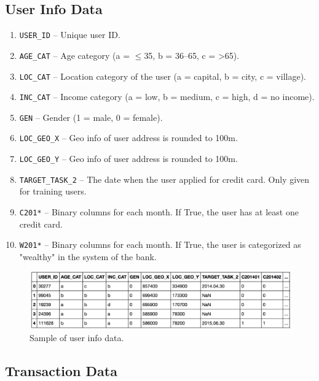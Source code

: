 \documentclass{llncs}
\begin{document}
	\subsection{User Info Data}
	
	\begin{enumerate}
		\item \verb|USER_ID| -- Unique user ID.
		\item \verb|AGE_CAT| -- Age category (a = $\le$35, b = 36--65, c = >65).
		\item \verb|LOC_CAT| -- Location category of the user (a = capital, b = city, c = village).
		\item \verb|INC_CAT| -- Income category (a = low, b = medium, c = high, d = no income).
		\item \verb|GEN| -- Gender (1 = male, 0 = female).
		\item \verb|LOC_GEO_X| -- Geo info of user address is rounded to 100m.
		\item \verb|LOC_GEO_Y| -- Geo info of user address is rounded to 100m.
		\item \verb|TARGET_TASK_2| -- The date when the user applied for credit card. Only given for training users.
		\item \verb|C201*| -- Binary columns for each month. If True, the user has at least one credit card.
		\item \verb|W201*| -- Binary columns for each month. If True, the user is categorized as "wealthy" in the system of the bank.
	\end{enumerate}
		
	\begin{figure}[h]
		\centering
		\includegraphics[width=\textwidth]{user_data}
		\caption{Sample of user info data.}
		\label{user_data}
	\end{figure}
	
	\subsection{Transaction Data}
	
\end{document}
